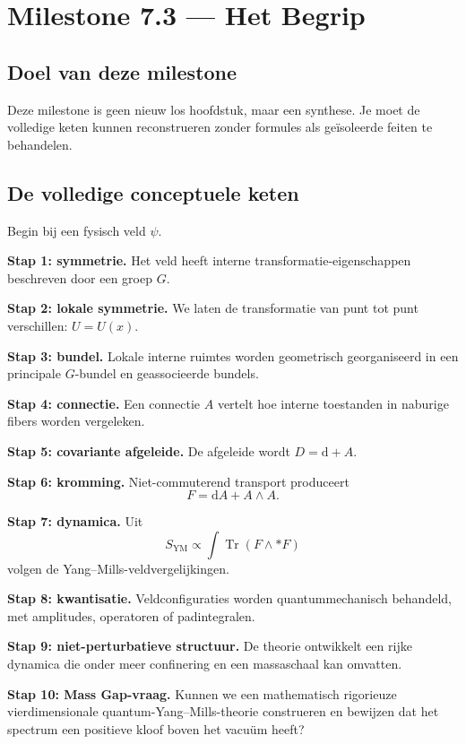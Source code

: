 \documentclass[11pt,a4paper]{article}
\newcommand{\dd}{\mathrm{d}}
\newcommand{\Tr}{\operatorname{Tr}}
\begin{document}
\newpage
\section{Milestone 7.3 --- Het Begrip}

\subsection{Doel van deze milestone}
Deze milestone is geen nieuw los hoofdstuk, maar een synthese. Je moet de volledige keten kunnen reconstrueren zonder formules als geïsoleerde feiten te behandelen.

\subsection{De volledige conceptuele keten}

Begin bij een fysisch veld $\psi$.

\textbf{Stap 1: symmetrie.} Het veld heeft interne transformatie-eigenschappen beschreven door een groep $G$.

\textbf{Stap 2: lokale symmetrie.} We laten de transformatie van punt tot punt verschillen: $U=U(x)$.

\textbf{Stap 3: bundel.} Lokale interne ruimtes worden geometrisch georganiseerd in een principale $G$-bundel en geassocieerde bundels.

\textbf{Stap 4: connectie.} Een connectie $A$ vertelt hoe interne toestanden in naburige fibers worden vergeleken.

\textbf{Stap 5: covariante afgeleide.} De afgeleide wordt $D=\dd+A$.

\textbf{Stap 6: kromming.} Niet-commuterend transport produceert
\[
F=\dd A+A\wedge A.
\]

\textbf{Stap 7: dynamica.} Uit
\[
S_{\mathrm{YM}}\propto\int\Tr(F\wedge *F)
\]
volgen de Yang--Mills-veldvergelijkingen.

\textbf{Stap 8: kwantisatie.} Veldconfiguraties worden quantummechanisch behandeld, met amplitudes, operatoren of padintegralen.

\textbf{Stap 9: niet-perturbatieve structuur.} De theorie ontwikkelt een rijke dynamica die onder meer confinering en een massaschaal kan omvatten.

\textbf{Stap 10: Mass Gap-vraag.} Kunnen we een mathematisch rigorieuze vierdimensionale quantum-Yang--Mills-theorie construeren en bewijzen dat het spectrum een positieve kloof boven het vacuüm heeft?
\end{document}
